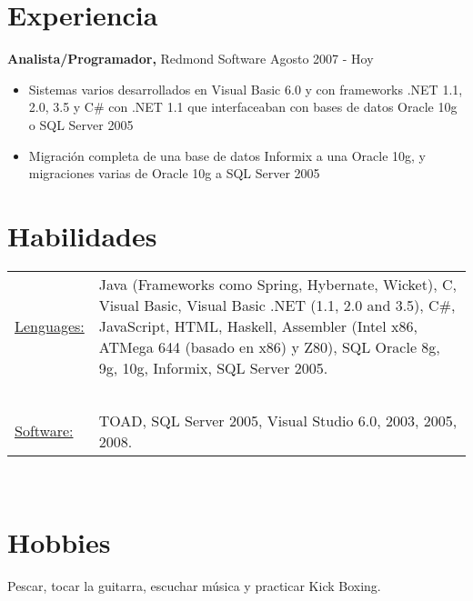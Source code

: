 \documentclass[margin]{res}
\begin{document}
\begin{resume}
\section{Experiencia}
 {\bf Analista/Programador,} Redmond Software \hfill Agosto 2007 - Hoy
 \begin{itemize} \itemsep -2pt  %
\item Sistemas varios desarrollados en Visual Basic 6.0 y con frameworks .NET 1.1, 2.0, 3.5 y C\# con .NET 1.1
que interfaceaban con bases de datos Oracle 10g o SQL Server 2005
\item Migraci\'on completa de una base de datos Informix a una Oracle 10g, y migraciones varias de 
Oracle 10g a SQL Server 2005\\
\end{itemize}


\section{Habilidades}
   \begin{tabular}{l p{3in}}
    \underline{Lenguages:} &  Java (Frameworks como Spring, Hybernate, Wicket), C, Visual Basic, 
    										Visual Basic .NET (1.1, 2.0 and 3.5), C\#, JavaScript, HTML, Haskell, 
    										Assembler (Intel x86, ATMega 644 (basado en x86) y Z80), SQL Oracle 8g, 9g, 10g, 
    										Informix, SQL Server 2005.\\
	\ & \ \\
     \underline{Software:} &  TOAD, SQL Server 2005, Visual Studio 6.0, 2003, 2005, 2008.\\
 \end{tabular}
\ \\
 
\section{Hobbies} Pescar, tocar la guitarra, escuchar m\'usica y practicar Kick Boxing.\\

\end{resume} 
\end{document}
